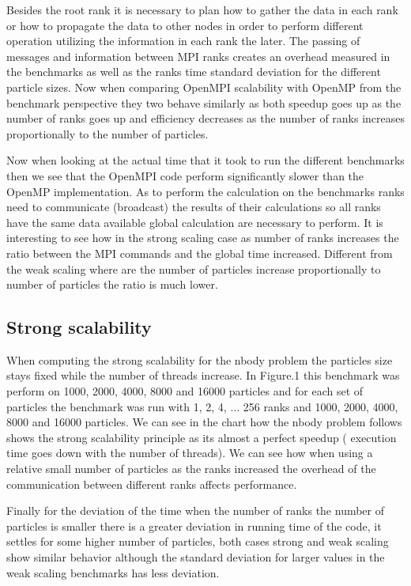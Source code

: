\documentclass[12pt]{article} %
\begin{document}
Besides the root rank it is necessary to plan how to gather the data in each rank or how to propagate the data to other nodes in order to perform different operation utilizing the information in each rank the later. The passing of messages and information between MPI ranks creates an overhead measured in the benchmarks as well as the ranks time standard deviation for the different particle sizes. Now when comparing OpenMPI scalability with OpenMP from the benchmark perspective they two behave similarly as both speedup goes up as the number of ranks goes up and efficiency decreases as the number of ranks increases proportionally to the number of particles.  

Now when looking at the actual time that it took to run the different benchmarks then we see that the OpenMPI code perform significantly slower than the OpenMP implementation. As to perform the calculation on the benchmarks ranks need to communicate (broadcast) the results of their calculations so all ranks have the same data available global calculation are necessary to perform. It is interesting to see how in the strong scaling case as number of ranks increases the ratio between the MPI commands and the global time increased. Different from the weak scaling where are the number of particles increase proportionally to number of particles the ratio is much lower.

\subsection{Strong scalability}

When computing the strong scalability for the nbody problem the particles size stays fixed while the number of threads increase. In Figure.1 this benchmark was perform on 1000, 2000, 4000, 8000 and 16000 particles and for each set of particles the benchmark was run with 1, 2, 4, $\dots$ 256 ranks and 1000, 2000, 4000, 8000 and 16000 particles. We can see in the chart how the nbody problem follows shows the strong scalability principle as its almost a perfect speedup ( execution time goes down with the number of threads). We can see how when using a relative small number of particles as the ranks increased the overhead of the communication between different ranks affects performance.

Finally for the deviation of the time when the number of ranks the number of particles is smaller there is a greater deviation in running time of the code, it settles for some higher number of particles, both cases strong and weak scaling show similar behavior although the standard deviation for larger values in the weak scaling benchmarks has less deviation.
\end{document}
